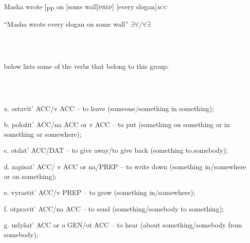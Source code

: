 \documentclass[output=paper,modfonts, nonflat]{langsci/langscibook}
\begin{document}
\begin{styleinnerExample}
    Masha wrote [\textsubscript{PP} on [some     wall]\textsc{prep}] [every   slogan]\textsc{acc~}
\end{styleinnerExample}

\begin{styleinnerExample}
    “Masha wrote every slogan on some wall” ${\exists}{\forall}$/${\forall}{\exists}$
\end{styleinnerExample}

\ea%
    \label{ex:key:18}
    \gll\\
        \\
    \glt
    \z

         below lists some of the verbs that belong to this group:

\begin{styleinnerExample}
\ea%
    \label{ex:key:18}
    \gll\\
        \\
    \glt
    \z

          a.  ostavit’ ACC/v ACC – to leave (someone/something in something);
\end{styleinnerExample}

\begin{styleinnerExample}
  b.   položit’ ACC/na ACC or v ACC – to put (something on something or in something or somewhere);
\end{styleinnerExample}

\begin{styleinnerExample}
  c.   otdat’ ACC/DAT – to give away/to give back (something to.somebody);
\end{styleinnerExample}

\begin{styleinnerExample}
  d.  zapisat’ ACC/ v ACC or na/PREP – to write down (something in/somewhere or on something);
\end{styleinnerExample}

\begin{styleinnerExample}
  e.  vyrastit’ ACC/v PREP – to grow (something in/somewhere);
\end{styleinnerExample}

\begin{styleinnerExample}
  f.   otpravit’ ACC/na ACC – to send (something/somebody to something);
\end{styleinnerExample}

\begin{styleinnerExample}
  g.   uslyšat’ ACC or o GEN/ot ACC – to hear (about something/somebody from somebody);
\end{styleinnerExample}
\end{document}
